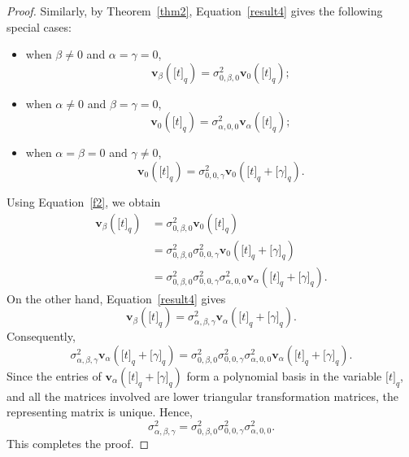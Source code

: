 \documentclass[12pt]{article}
\def\v{\mathbf{v}}
\begin{document}
\begin{proof}
	Similarly, by Theorem~\ref{thm2}, Equation~\eqref{result4} gives the following special cases:
	\begin{itemize}
		\item when $\beta\neq 0$ and $\alpha=\gamma=0$,
		\begin{equation}
			\v_{\beta}\left(\big[t\big]_q\right)
			=
			\sigma_{0,\beta,0}^2
			\v_{0}\left(\big[t\big]_q\right);
			\label{f2}
		\end{equation}
		\item when $\alpha\neq 0$ and $\beta=\gamma=0$,
		\begin{equation*}
			\v_{0}\left(\big[t\big]_q\right)
			=
			\sigma_{\alpha,0,0}^2
			\v_{\alpha}\left(\big[t\big]_q\right);
		\end{equation*}
		\item when $\alpha=\beta=0$ and $\gamma\neq 0$,
		\begin{equation*}
			\v_{0}\left(\big[t\big]_q\right)
			=
			\sigma_{0,0,\gamma}^2
			\v_{0}\left(\big[t\big]_q+\big[\gamma\big]_q\right).
		\end{equation*}
	\end{itemize}
	Using Equation~\eqref{f2}, we obtain
	\begin{align*}
		\v_{\beta}\left(\big[t\big]_q\right)
		&=
		\sigma_{0,\beta,0}^2
		\v_{0}\left(\big[t\big]_q\right)\\
		&=
		\sigma_{0,\beta,0}^2
		\sigma_{0,0,\gamma}^2
		\v_{0}\left(\big[t\big]_q+\big[\gamma\big]_q\right)\\
		&=
		\sigma_{0,\beta,0}^2
		\sigma_{0,0,\gamma}^2
		\sigma_{\alpha,0,0}^2
		\v_{\alpha}\left(\big[t\big]_q+\big[\gamma\big]_q\right).
	\end{align*}
	On the other hand, Equation~\eqref{result4} gives
	\begin{equation*}
		\v_{\beta}\left(\big[t\big]_q\right)
		=
		\sigma_{\alpha,\beta,\gamma}^2
		\v_{\alpha}\left(\big[t\big]_q+\big[\gamma\big]_q\right).
	\end{equation*}
	Consequently,
	\begin{equation*}
		\sigma_{\alpha,\beta,\gamma}^2
		\v_{\alpha}\left(\big[t\big]_q+\big[\gamma\big]_q\right)
		=
		\sigma_{0,\beta,0}^2
		\sigma_{0,0,\gamma}^2
		\sigma_{\alpha,0,0}^2
		\v_{\alpha}\left(\big[t\big]_q+\big[\gamma\big]_q\right).
	\end{equation*}
	Since the entries of
	$\v_{\alpha}\left(\big[t\big]_q+\big[\gamma\big]_q\right)$
	form a polynomial basis in the variable $\big[t\big]_q$, and all the matrices involved are lower triangular transformation matrices, the representing matrix is unique. Hence,
	\begin{equation*}
		\sigma_{\alpha,\beta,\gamma}^2
		=
		\sigma_{0,\beta,0}^2
		\sigma_{0,0,\gamma}^2
		\sigma_{\alpha,0,0}^2.
	\end{equation*}
	This completes the proof.
\end{proof}
\end{document}
